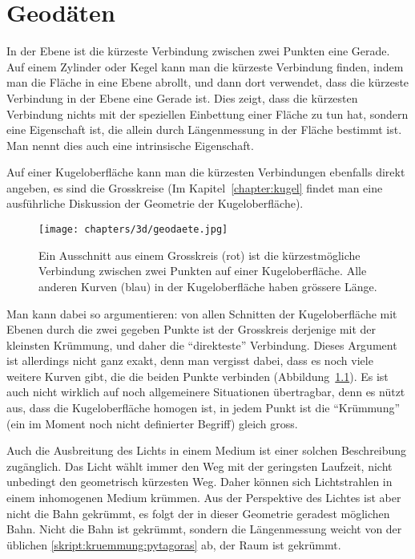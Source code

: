 %
%
\chapter{Geodäten
\label{skript:chapter:geodaeten}}
\rhead{}
In der Ebene ist die kürzeste Verbindung zwischen zwei Punkten
eine Gerade.
Auf einem Zylinder oder Kegel kann man die kürzeste Verbindung finden,
indem man die Fläche in eine Ebene abrollt, und dann dort verwendet,
dass die kürzeste Verbindung in der Ebene eine Gerade ist.
Dies zeigt, dass die kürzesten Verbindung nichts mit der speziellen
Einbettung einer Fläche zu tun hat, sondern eine Eigenschaft ist,
die allein durch Längenmessung in der Fläche bestimmt ist.
Man nennt dies auch eine intrinsische Eigenschaft.

Auf einer Kugeloberfläche kann man die kürzesten Verbindungen ebenfalls
direkt angeben, es sind die Grosskreise (Im Kapitel~\ref{chapter:kugel}
%
findet man eine ausführliche Diskussion der Geometrie der Kugeloberfläche).
\begin{figure}
\centering
\texttt{[image: chapters/3d/geodaete.jpg]}
\caption{Ein Ausschnitt aus einem Grosskreis (rot) ist die kürzestmögliche
Verbindung zwischen zwei Punkten auf einer Kugeloberfläche.
Alle anderen Kurven (blau) in der Kugeloberfläche haben grössere Länge.
\label{skript:kruemmung:fig:geodaete}}
\end{figure}
Man kann dabei so argumentieren: von allen Schnitten der Kugeloberfläche
mit Ebenen durch die zwei gegeben Punkte ist der Grosskreis derjenige
mit der kleinsten Krümmung, und daher die ``direkteste'' Verbindung.
Dieses Argument ist allerdings nicht ganz exakt, denn man vergisst dabei,
dass es noch viele weitere Kurven gibt, die die beiden Punkte verbinden
(Abbildung~\ref{skript:kruemmung:fig:geodaete}).
Es ist auch nicht wirklich auf noch allgemeinere Situationen übertragbar,
denn es nützt aus, dass die Kugeloberfläche homogen ist, in jedem Punkt
ist die ``Krümmung'' (ein im Moment noch nicht definierter Begriff) 
gleich gross.

Auch die Ausbreitung des Lichts in einem Medium ist einer solchen
Beschreibung zugänglich.
Das Licht wählt immer den Weg mit der geringsten Laufzeit, nicht
unbedingt den geometrisch kürzesten Weg.
Daher können sich Lichtstrahlen in einem inhomogenen Medium
krümmen.
Aus der Perspektive des Lichtes ist aber nicht die Bahn gekrümmt,
es folgt der in dieser Geometrie geradest möglichen Bahn.
Nicht die Bahn ist gekrümmt, sondern die Längenmessung weicht von
der üblichen \eqref{skript:kruemmung:pytagoras} ab, der Raum ist
gekrümmt.

